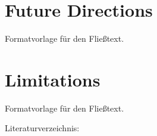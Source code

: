 \documentclass[a4paper,12pt,twoside]{scrreprt}
\begin{document}
\section{Future Directions}
Formatvorlage für den Fließtext.

\section{Limitations}
Formatvorlage für den Fließtext.

Literaturverzeichnis:
\clearpage
{}
{}
\printbibliography


\end{document}
